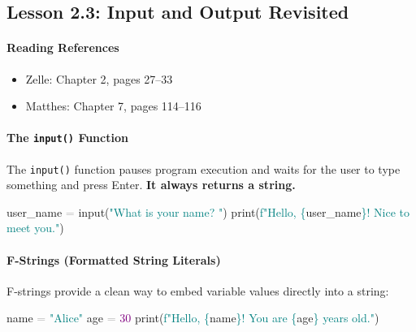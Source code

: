 \documentclass[
  justified,
  openright,
]{tufte-book}
\let\subsubsection\paragraph
\let\paragraph\paragraph
\newcommand{\BuiltInTok}[1]{#1}
\newcommand{\DecValTok}[1]{\textcolor{Purple}{#1}}
\newcommand{\NormalTok}[1]{#1}
\newcommand{\OperatorTok}[1]{\textcolor{DarkGray}{#1}}
\newcommand{\SpecialCharTok}[1]{\textcolor{Teal}{#1}}
\newcommand{\SpecialStringTok}[1]{\textcolor{Teal}{#1}}
\newcommand{\StringTok}[1]{\textcolor{Teal}{#1}}
\newenvironment{Shaded}{%
  \begin{snugshade}
}{%
  \end{snugshade}
}
\let\subsubsection\paragraph
\let\paragraph\paragraph
\providecommand{\tightlist}{%
  \setlength{\itemsep}{0pt}\setlength{\parskip}{0pt}}
\begin{document}
\subsection{Lesson 2.3: Input and Output
Revisited}\label{lesson-2.3-input-and-output-revisited}

\subsubsection{Reading References}\label{reading-references-9}

\begin{itemize}
\tightlist
\item
  Zelle: Chapter 2, pages 27--33
\item
  Matthes: Chapter 7, pages 114--116
\end{itemize}

\subsubsection{\texorpdfstring{The \texttt{input()}
Function}{The input() Function}}\label{the-input-function}

The \texttt{input()} function pauses program execution and waits for the
user to type something and press Enter. \textbf{It always returns a
string.}

\begin{Shaded}
\begin{Highlighting}[]
\NormalTok{user\_name }\OperatorTok{=} \BuiltInTok{input}\NormalTok{(}\StringTok{"What is your name? "}\NormalTok{)}
\BuiltInTok{print}\NormalTok{(}\SpecialStringTok{f"Hello, }\SpecialCharTok{\{}\NormalTok{user\_name}\SpecialCharTok{\}}\SpecialStringTok{! Nice to meet you."}\NormalTok{)}
\end{Highlighting}
\end{Shaded}

\subsubsection{F-Strings (Formatted String
Literals)}\label{f-strings-formatted-string-literals}

F-strings provide a clean way to embed variable values directly into a
string:

\begin{Shaded}
\begin{Highlighting}[]
\NormalTok{name }\OperatorTok{=} \StringTok{"Alice"}
\NormalTok{age }\OperatorTok{=} \DecValTok{30}
\BuiltInTok{print}\NormalTok{(}\SpecialStringTok{f"Hello, }\SpecialCharTok{\{}\NormalTok{name}\SpecialCharTok{\}}\SpecialStringTok{! You are }\SpecialCharTok{\{}\NormalTok{age}\SpecialCharTok{\}}\SpecialStringTok{ years old."}\NormalTok{)}
\end{Highlighting}
\end{Shaded}
\end{document}
